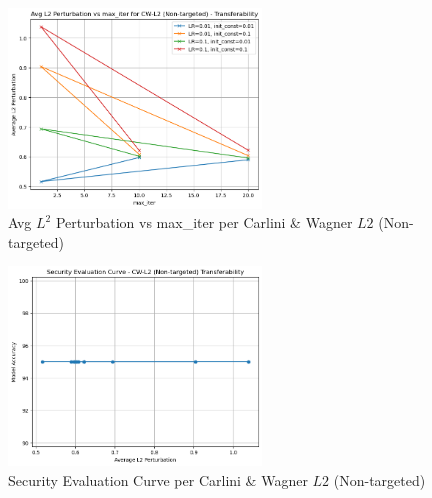         \begin{figure}[H]
            \centering
            \includegraphics[width=0.6\textwidth]{images/cwtrasuntargl2-1.png}
            \caption{Avg $L^2$ Perturbation vs max\_iter per Carlini \& Wagner $L2$ (Non-targeted)}
            \label{fig:cw_untarg_l2_pert}
        \end{figure}
        
        \begin{figure}[H]
            \centering
            \includegraphics[width=0.6\textwidth]{images/cwtrasuntargl2sec.png}
            \caption{Security Evaluation Curve per Carlini \& Wagner $L2$ (Non-targeted)}
            \label{fig:cw_untarg_l2_sec}
        \end{figure}

